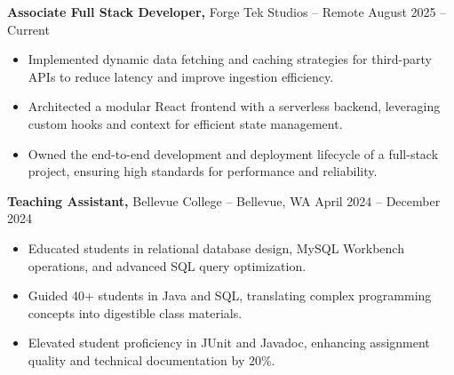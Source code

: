 \documentclass[11pt]{article}       %
\begin{document}
\textbf{Associate Full Stack Developer,} {Forge Tek Studios} -- Remote \hfill August 2025 -- Current 
\vspace{-9pt}
\begin{itemize}
  \item Implemented dynamic data fetching and caching strategies for third-party APIs to reduce latency and improve ingestion efficiency.
  \item Architected a modular React frontend with a serverless backend, leveraging custom hooks and context for efficient state management.
  \item Owned the end-to-end development and deployment lifecycle of a full-stack project, ensuring high standards for performance and reliability.
\end{itemize}

\textbf{Teaching Assistant,} {Bellevue College} -- Bellevue, WA \hfill April 2024 -- December 2024 \\
\vspace{-9pt}
\begin{itemize}
  \item Educated students in relational database design, MySQL Workbench operations, and advanced SQL query optimization.
  \item Guided 40+ students in Java and SQL, translating complex programming concepts into digestible class materials.
  \item Elevated student proficiency in JUnit and Javadoc, enhancing assignment quality and technical documentation by 20\%.
\end{itemize}

\end{document}
